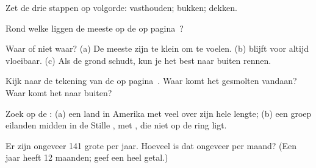 \begin{exercise}[$\star$]\label{exo:g4:volcanoes-earthquakes-first-look:3}
Zet de drie stappen op volgorde: vasthouden; bukken; dekken.
\end{exercise}

\begin{exercise}[$\star$]\label{exo:g4:volcanoes-earthquakes-first-look:4}
Rond welke  liggen de meeste  op de  op
pagina~\pageref{fig:g4:volcanoes-earthquakes-first-look:map}?
\end{exercise}

\begin{exercise}[$\star$]\label{exo:g4:volcanoes-earthquakes-first-look:5}
Waar of niet waar? (a) De meeste  zijn te klein om te voelen.
(b)  blijft voor altijd vloeibaar. (c) Als de grond schudt, kun je het
best naar buiten rennen.
\end{exercise}

\begin{exercise}[$\star$]\label{exo:g4:volcanoes-earthquakes-first-look:6}
Kijk naar de tekening van de  op pagina~\pageref{fig:g4:volcanoes-earthquakes-first-look:volcano}.
Waar komt het gesmolten  vandaan? Waar komt het naar buiten?
\end{exercise}

\begin{exercise}[$\star\star$]\label{exo:g4:volcanoes-earthquakes-first-look:7}
Zoek op de : (a) een land in Amerika met veel  over zijn
hele lengte; (b) een groep eilanden midden in de Stille , met
, die niet op de ring ligt.
\end{exercise}

\begin{exercise}[$\star\star$]\label{exo:g4:volcanoes-earthquakes-first-look:8}
Er zijn ongeveer 141 grote  per jaar. Hoeveel is dat ongeveer
per maand? (Een jaar heeft 12 maanden; geef een heel getal.)
\end{exercise}

